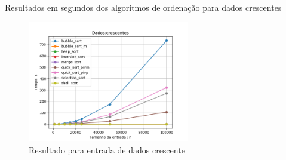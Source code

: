 \documentclass[10pt,a4paper]{article}
\begin{document}
\begin{center}
\begin{table}[H]
            \caption{Resultados em segundos dos algoritmos de ordenação para dados crescentes}
        \end{table}
        \begin{figure}[H]
            \centering
            \includegraphics[width=0.63\textwidth]{Resultados/Graficos/crescentes.png}
            \caption{Resultado para entrada de dados crescente}
        \end{figure}
    \end{center}
    
\end{document}
